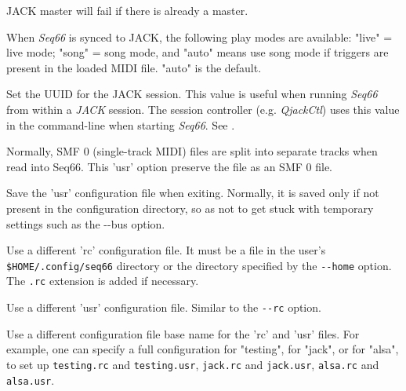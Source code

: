       JACK master will fail if there is already a master.


      When \textsl{Seq66} is synced to JACK, the following play modes
      are available: "live" = live mode; "song" = song mode, and "auto" means
      use song mode if triggers are present in the loaded MIDI file. "auto" is
      the default.


      Set the UUID for the JACK session.  This value is useful when
      running \textsl{Seq66} from within a \textsl{JACK} session.
      The session controller (e.g. \textsl{QjackCtl}) uses this value in the
      command-line when starting \textsl{Seq66}.
      See .

      Normally, SMF 0 (single-track MIDI) files are split into separate tracks
      when read into Seq66.  This 'usr' option preserve the file as an SMF 0
      file.

      Save the 'usr' configuration file when exiting.
      Normally, it is saved only if not present in the configuration directory,
      so as not to get stuck with temporary settings such as the -{}-bus option.


      Use a different 'rc' configuration file.
      It must be a file in the user's \texttt{\$HOME/.config/seq66}
      directory or the directory specified by the \texttt{-{}-home} option.
      The \texttt{.rc} extension is added if necessary.

      Use a different 'usr' configuration file.  Similar to the \texttt{-{}-rc}
      option.

      Use a different configuration file base name for the 'rc' and 'usr'
      files.  For example, one can specify a full configuration for "testing",
      for "jack", or for "alsa", to set up
      \texttt{testing.rc} and \texttt{testing.usr},
      \texttt{jack.rc} and \texttt{jack.usr},
      \texttt{alsa.rc} and \texttt{alsa.usr}.

